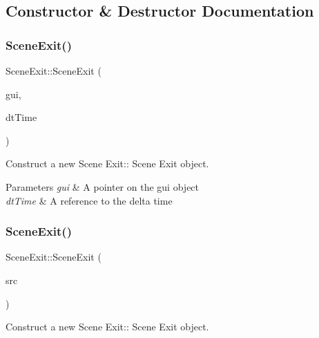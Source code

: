 \subsection{Constructor \& Destructor Documentation}
\mbox{\label{class_scene_exit_ac7fd49d030cc70f80bcedd66017f461f}} 
\subsubsection{\texorpdfstring{Scene\+Exit()}{SceneExit()}\hspace{0.1cm}{\footnotesize\ttfamily [1/2]}}
{\footnotesize\ttfamily Scene\+Exit\+::\+Scene\+Exit (\begin{DoxyParamCaption}\item[{\hyperlink{class_gui}{Gui} $\ast$}]{gui,  }\item[{float const \&}]{dt\+Time }\end{DoxyParamCaption})}



Construct a new Scene Exit\+:\+: Scene Exit object. 


\begin{DoxyParams}{Parameters}
{\em gui} & A pointer on the gui object \\
\hline
{\em dt\+Time} & A reference to the delta time \\
\hline
\end{DoxyParams}
\mbox{\label{class_scene_exit_a12008540e3edf0c1cd49140d5189f918}} 
\subsubsection{\texorpdfstring{Scene\+Exit()}{SceneExit()}\hspace{0.1cm}{\footnotesize\ttfamily [2/2]}}
{\footnotesize\ttfamily Scene\+Exit\+::\+Scene\+Exit (\begin{DoxyParamCaption}\item[{\hyperlink{class_scene_exit}{Scene\+Exit} const \&}]{src }\end{DoxyParamCaption})}



Construct a new Scene Exit\+:\+: Scene Exit object. 



